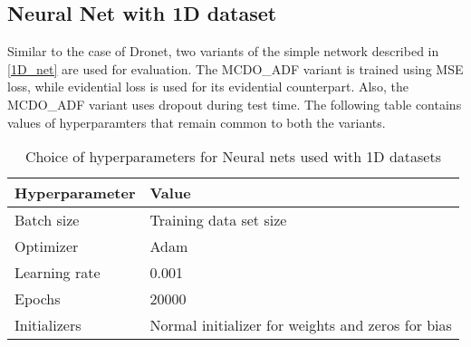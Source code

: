 \subsection{Neural Net with 1D dataset}
Similar to the case of Dronet, two variants of the simple network described in \ref{1D_net} are used for evaluation. The MCDO\_ADF variant is trained using MSE loss, while evidential loss is used for its evidential counterpart. Also, the MCDO\_ADF variant uses dropout during test time. The following table contains values of hyperparamters that remain common to both the variants.
\begin{table}[H]
	\centering
	\begin{tabular}{|l|l|} 
		\hline
		\textbf{Hyperparameter} & \textbf{Value}                         \\ 
		\hline
		Batch size              & Training data set size                 \\ 
		\hline
		Optimizer               & Adam                                   \\ 
		\hline
		Learning rate           & 0.001                                  \\ 
		\hline
		Epochs                  & 20000                                  \\ 
		\hline
		Initializers            & Normal initializer for weights and zeros for bias  \\
		\hline
	\end{tabular}
\caption{Choice of hyperparameters for Neural nets used with 1D datasets}
\end{table}

